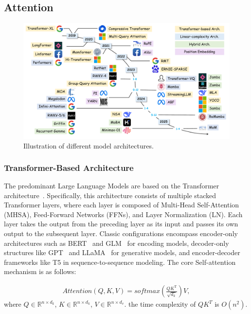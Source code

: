 \documentclass[11pt, a4paper, logo, copyright, nonumbering]{map}
\begin{document}
\subsection{Attention}
\begin{figure}[!htp]
    \centering
    \includegraphics[width=1.0\linewidth]{graphs/lc_model_new.pdf}
    \caption{Illustration of different model architectures.}
    \label{fig:overview_model}
\end{figure}
\subsubsection{Transformer-Based Architecture}
\label{ssec:transformer_based_arch}

The predominant Large Language Models are based on the Transformer architecture~\cite{vaswani2017attention}. Specifically, this architecture consists of multiple stacked Transformer layers, where each layer is composed of Multi-Head Self-Attention (MHSA), Feed-Forward Networks (FFNs), and Layer Normalization (LN). Each layer takes the output from the preceding layer as its input and passes its own output to the subsequent layer. Classic configurations encompass encoder-only architectures such as BERT~\citep{Devlin2019BERTPO} and GLM~\citep{du-etal-2022-glm} for encoding models, decoder-only structures like GPT~\citep{10.5555/3495724.3495883} and LLaMA~\citep{touvron2023llama} for generative models, and encoder-decoder frameworks like T5 in sequence-to-sequence modeling. The core Self-attention~\citep{vaswani2017attention} mechanism  is as follows:

\begin{equation}
    \begin{aligned}
         Attention(Q, K, V)=softmax(\frac{QK^{\mathrm{T}}}{\sqrt{d_{k}}})V,
    \end{aligned}
    \label{eq:attention}
\end{equation}
where $Q \in \mathbb{R}^{n\times d_k}$, $K \in \mathbb{R}^{n\times d_k}$, $V \in \mathbb{R}^{n\times d_v}$. the time complexity of $QK^{T}$ is $O(n^{2})$.
\end{document}
